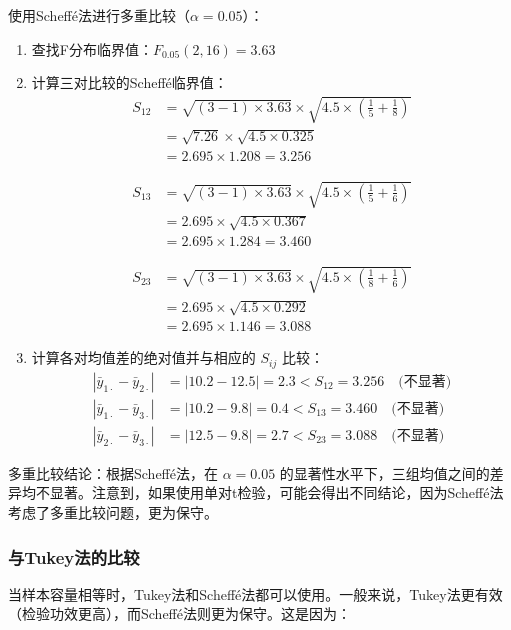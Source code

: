 \documentclass[12pt, a4paper]{amsart}
\begin{document}
使用Scheffé法进行多重比较（$\alpha=0.05$）：
\begin{enumerate}
    \item 查找F分布临界值：$F_{0.05}(2, 16) = 3.63$
    \item 计算三对比较的Scheffé临界值：
    \begin{align*}
S_{12} &= \sqrt{(3-1) \times 3.63} \times \sqrt{4.5 \times (\frac{1}{5} + \frac{1}{8})} \\
&= \sqrt{7.26} \times \sqrt{4.5 \times 0.325} \\
&= 2.695 \times 1.208 = 3.256
\end{align*}
    
    \begin{align*}
S_{13} &= \sqrt{(3-1) \times 3.63} \times \sqrt{4.5 \times (\frac{1}{5} + \frac{1}{6})} \\
&= 2.695 \times \sqrt{4.5 \times 0.367} \\
&= 2.695 \times 1.284 = 3.460
\end{align*}
    
    \begin{align*}
S_{23} &= \sqrt{(3-1) \times 3.63} \times \sqrt{4.5 \times (\frac{1}{8} + \frac{1}{6})} \\
&= 2.695 \times \sqrt{4.5 \times 0.292} \\
&= 2.695 \times 1.146 = 3.088
\end{align*}
    
    \item 计算各对均值差的绝对值并与相应的 $S_{ij}$ 比较：
    \begin{align*}
|\bar{y}_{1\cdot} - \bar{y}_{2\cdot}| &= |10.2 - 12.5| = 2.3 < S_{12} = 3.256 \quad \text{(不显著)} \\
|\bar{y}_{1\cdot} - \bar{y}_{3\cdot}| &= |10.2 - 9.8| = 0.4 < S_{13} = 3.460 \quad \text{(不显著)} \\
|\bar{y}_{2\cdot} - \bar{y}_{3\cdot}| &= |12.5 - 9.8| = 2.7 < S_{23} = 3.088 \quad \text{(不显著)}
\end{align*}
\end{enumerate}

多重比较结论：根据Scheffé法，在 $\alpha=0.05$ 的显著性水平下，三组均值之间的差异均不显著。注意到，如果使用单对t检验，可能会得出不同结论，因为Scheffé法考虑了多重比较问题，更为保守。

\subsubsection{与Tukey法的比较}
当样本容量相等时，Tukey法和Scheffé法都可以使用。一般来说，Tukey法更有效（检验功效更高），而Scheffé法则更为保守。这是因为：
\end{document}
